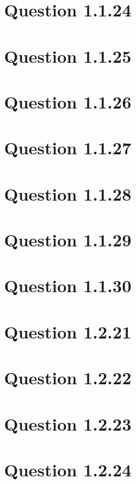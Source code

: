 \documentclass[journal,12pt,twocolumn]{IEEEtran}
\begin{document}
\section{\textbf{Question 1.1.24}}

\section{\textbf{Question 1.1.25}}

\section{\textbf{Question 1.1.26}}

\section{\textbf{Question 1.1.27}}

\section{\textbf{Question 1.1.28}}

\section{\textbf{Question 1.1.29}}

\section{\textbf{Question 1.1.30}}



\section{\textbf{Question 1.2.21}}

\section{\textbf{Question 1.2.22}}

\section{\textbf{Question 1.2.23}}

\section{\textbf{Question 1.2.24}}

\end{document}
